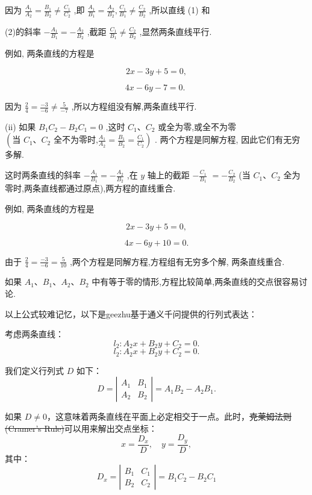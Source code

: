 \documentclass[lang=cn,newtx,10pt,scheme=chinese]{elegantbook}
\begin{document}
因为 \(\frac{{A}_{1}}{{A}_{2}} = \frac{{B}_{1}}{{B}_{2}} \neq \frac{{C}_{1}}{{C}_{2}}\) ,即 \(\frac{{A}_{1}}{{B}_{1}} = \frac{{A}_{2}}{{B}_{2}},\frac{{C}_{1}}{{B}_{1}} \neq \frac{{C}_{2}}{{B}_{2}}\) ,所以直线 (1) 和

(2)的斜率 \(- \frac{{A}_{1}}{{B}_{1}} = - \frac{{A}_{2}}{{B}_{2}}\) ,截距 \(\frac{{C}_{1}}{{B}_{1}} \neq \frac{{C}_{2}}{{B}_{2}}\) ,显然两条直线平行.

例如, 两条直线的方程是

\[
    {2x} - {3y} + 5 = 0,
\]

\[
    {4x} - {6y} - 7 = 0\text{. }
\]

因为 \(\frac{2}{4} = \frac{-3}{-6} \neq \frac{5}{-7}\) ,所以方程组没有解,两条直线平行.

(ii) 如果 \({B}_{1}{C}_{2} - {B}_{2}{C}_{1} = 0\) ,这时 \({C}_{1}\text{、}{C}_{2}\) 或全为零,或全不为零 \(\left( {\text{当 }{C}_{1}\text{、}{C}_{2}\text{ 全不为零时,}\frac{{A}_{1}}{{A}_{2}} = \frac{{B}_{1}}{{B}_{2}} = \frac{{C}_{1}}{{C}_{2}}}\right)\) . 两个方程是同解方程, 因此它们有无穷多解.

这时两条直线的斜率 \(- \frac{{A}_{1}}{{B}_{1}} = - \frac{{A}_{2}}{{B}_{2}}\) ,在 \(y\) 轴上的截距 \(- \frac{{C}_{1}}{{B}_{1}}\) \(= - \frac{{C}_{2}}{{B}_{2}}\) (当 \({C}_{1}\text{、}{C}_{2}\) 全为零时,两条直线都通过原点),两方程的直线重合.

例如, 两条直线的方程是

\[
    {2x} - {3y} + 5 = 0,
\]

\[
    {4x} - {6y} + {10} = 0.
\]

由于 \(\frac{2}{4} = \frac{-3}{-6} = \frac{5}{10}\) ,两个方程是同解方程,方程组有无穷多个解, 两条直线重合.

如果 \({A}_{1}\text{、}{B}_{1}\text{、}{A}_{2}\text{、}{B}_{2}\) 中有等于零的情形,方程比较简单,两条直线的交点很容易讨论.

以上公式较难记忆，以下是geezhu基于通义千问提供的行列式表达：

考虑两条直线：
\[
l_2: A_2x + B_2y + C_2 = 0.
\]
\[
l_2: A_2x + B_2y + C_2 = 0.
\]

我们定义行列式 \(D\) 如下：
\[
  D = \left| \begin{array}{cc}
               A_1 & B_1 \\
               A_2 & B_2
  \end{array} \right| = A_1B_2 - A_2B_1.
\]

如果 \(D \neq 0\)，这意味着两条直线在平面上必定相交于一点。此时，\sout{克莱姆法则(Cramer's Rule)}可以用来解出交点坐标：
\[
  x = \frac{D_x}{D}, \quad y = \frac{D_y}{D},
\]
其中：
\[
  D_x = \left| \begin{array}{cc}
                  B_1 & C_1 \\
                  B_2 & C_2
  \end{array} \right|=B_1C_2-B_2C_1\]
\end{document}
